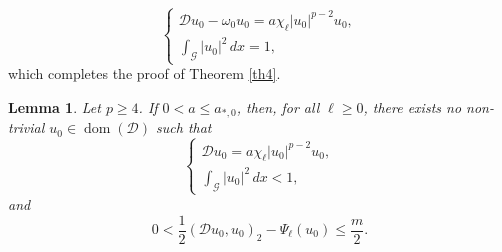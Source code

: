 \documentclass[11pt]{amsart}
\newtheorem{lemma}[theorem]{Lemma}
\newcommand{\abs}[1]{\lvert#1\rvert}
\newcommand{\D}{\mathcal{D}}
\newcommand{\G}{\mathcal{G}}
\numberwithin{equation}{section}
\begin{document}
$$
\left\{\begin{array}{l}
\D u_{0}-\omega_{0} u_{0}=a\chi_{\ell}\abs{u_{0}}^{p-2} u_{0},\\
\int_{\G}\left|u_{0}\right|^{2} \,dx = 1,
\end{array}\right.
$$
which completes the proof of Theorem \ref{th4}.
\begin{lemma}\label{lempgeq4}
    Let $p \geq 4$. If $0 < a \leq a_{*,0}$, then, for all $\ell \geq 0$, there exists no non-trivial $u_{0} \in \operatorname{dom}(\D)$ such that
    $$
\left\{\begin{array}{l}
\D u_{0}=a\chi_{\ell}\abs{u_{0}}^{p-2} u_{0}, \\
\int_{\G}\left|u_{0}\right|^{2} \,dx < 1,
\end{array}\right.
$$
and
$$
0<\frac{1}{2}(\D u_{0}, u_{0})_{2}-\Psi_\ell(u_{0})\leq\frac{m}{2}.
$$
\end{lemma}
\end{document}
